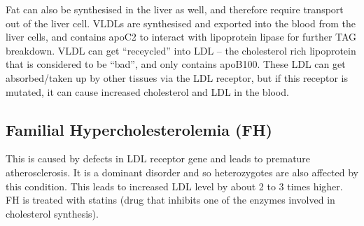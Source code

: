 \documentclass[a4paper, 12pt]{report}
\begin{document}
Fat can also be synthesised in the liver as well, and therefore require transport out of the liver cell.
VLDLs are synthesised and exported into the blood from the liver cells, and contains apoC2 to interact with lipoprotein lipase for further TAG breakdown.
VLDL can get ``receycled'' into LDL -- the cholesterol rich lipoprotein that is considered to be ``bad'', and only contains apoB100.
These LDL can get absorbed/taken up by other tissues via  the LDL receptor, but if this receptor is mutated, it can cause increased cholesterol and LDL in the blood.

\subsection{Familial Hypercholesterolemia (FH)}

This is caused by defects in LDL receptor gene and leads to premature atherosclerosis.
It is a dominant disorder and so heterozygotes are also affected by this condition.
This leads to increased LDL level by about 2 to 3 times higher.
FH is treated with statins (drug that inhibits one of the enzymes involved in cholesterol synthesis).
\end{document}
